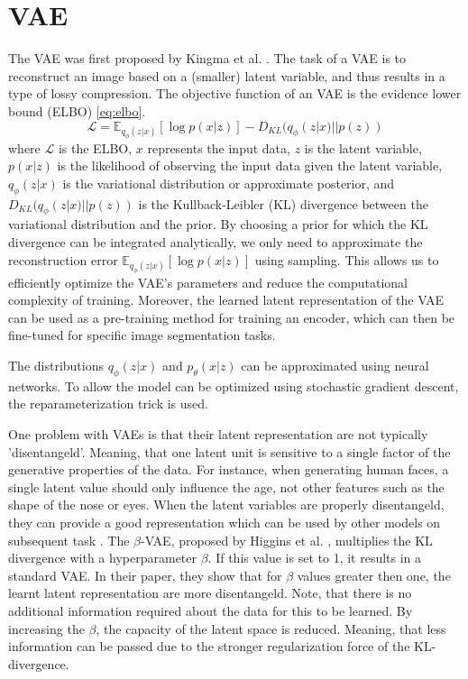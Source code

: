 \section{VAE}
The VAE was first proposed by Kingma et al. \cite{kingma2014autoencodingvariationalbayes}. The task of a VAE is to reconstruct an image based on a (smaller) latent variable, and thus results in a type of lossy compression. The objective function of an VAE is the evidence lower bound (ELBO) \ref{eq:elbo}.
\begin{equation}
    \label{eq:elbo}
    \mathcal{L} = \mathbb{E}_{q_{\phi}(z|x)}[\log p(x|z)] - D_{KL}(q_{\phi}(z|x) || p(z))
\end{equation}
where $\mathcal{L}$ is the ELBO, $x$ represents the input data, $z$ is the latent variable, $p(x|z)$ is the likelihood of observing the input data given the latent variable, $q_\phi(z|x)$ is the variational distribution or approximate posterior, and $D_{KL}(q_{\phi}(z|x) || p(z))$ is the Kullback-Leibler (KL) divergence between the variational distribution and the prior. By choosing a prior for which the KL divergence can be integrated analytically, we only need to approximate the reconstruction error $\mathbb{E}_{q_{\phi}(z|x)}[\log p(x|z)]$ using sampling. This allows us to efficiently optimize the VAE's parameters and reduce the computational complexity of training. Moreover, the learned latent representation of the VAE can be used as a pre-training method for training an encoder, which can then be fine-tuned for specific image segmentation tasks.

The distributions $q_{\phi}(z | x)$ and $p_{\theta}(x | z)$ can be approximated using neural networks. To allow the model can be optimized using stochastic gradient descent, the reparameterization trick is used.

One problem with VAEs is that their latent representation are not typically 'disentangeld'. Meaning, that one latent unit is sensitive to a single factor of the generative properties of the data. For instance, when generating human faces, a single latent value should only influence the age, not other features such as the shape of the nose or eyes. When the latent variables are properly disentangeld, they can provide a good representation which can be used by other models on subsequent task \cite{bengio2014representationlearningreviewnew}. The $\beta$-VAE, proposed by Higgins et al. \cite{higgins2017betavae}, multiplies the KL divergence with a hyperparameter $\beta$. If this value is set to 1, it results in a standard VAE. In their paper, they show that for $\beta$ values greater then one, the learnt latent representation are more disentangeld. Note, that there is no additional information required about the data for this to be learned. By increasing the $\beta$, the capacity of the latent space is reduced. Meaning, that less information can be passed due to the stronger regularization force of the KL-divergence.

